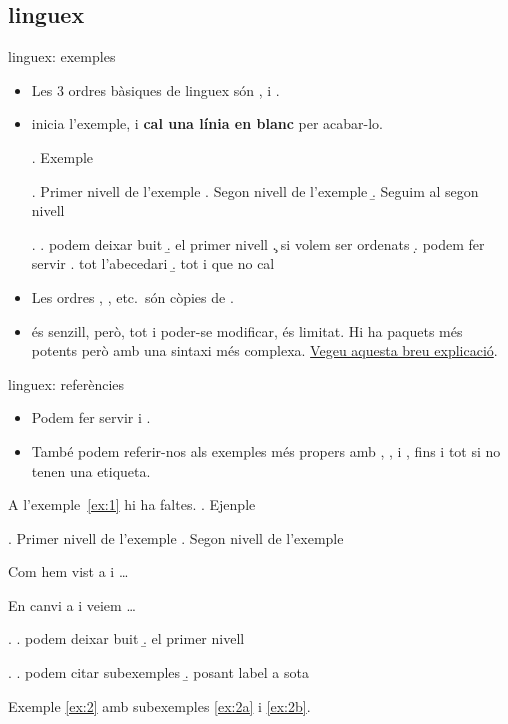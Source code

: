\subsection{linguex}
\begin{frame}[fragile]{linguex: exemples}
\begin{itemize}
\item Les 3 ordres bàsiques de linguex són ,  i .
\item {} inicia l'exemple, i \textbf{cal una línia en blanc} per acabar-lo.
\begin{exampletwouptiny2}
\ex. Exemple

\ex. Primer nivell de l'exemple
\a. Segon nivell de l'exemple
\b. Seguim al segon nivell

\ex.
\a. podem deixar buit
\b. el primer nivell
\c. si volem ser ordenats
\d. podem fer servir
\e. tot l'abecedari
\b. tot i que no cal

\end{exampletwouptiny2}
\item Les ordres , , etc.~són còpies de .
\item {} és senzill, però, tot i poder-se modificar, és limitat. Hi ha paquets més potents però amb una sintaxi més complexa. \href{https://www.jostellings.com/numbex.html}{Vegeu aquesta breu explicació}.
\end{itemize}
\end{frame}

\begin{frame}[fragile]{linguex: referències}
\begin{itemize}
\item Podem fer servir  i .
\item També podem referir-nos als exemples més propers amb , ,  i , fins i tot si no tenen una etiqueta.
\end{itemize}
\begin{exampletwouptiny2}
A l'exemple~\ref{ex:1} hi ha faltes.
\ex. Ejenple
\label{ex:1}

\ex. Primer nivell de l'exemple
\a. Segon nivell de l'exemple

Com hem vist a \LLast i \Last \dots

En canvi a \Next i \NNext veiem \dots

\ex.
\a. podem deixar buit
\b. el primer nivell

\ex.
\label{ex:2}
\a. podem citar subexemples
\label{ex:2a}
\b. posant label a sota
\label{ex:2b}

Exemple \ref{ex:2} amb subexemples
\ref{ex:2a} i \ref{ex:2b}.

\end{exampletwouptiny2}
\end{frame}

